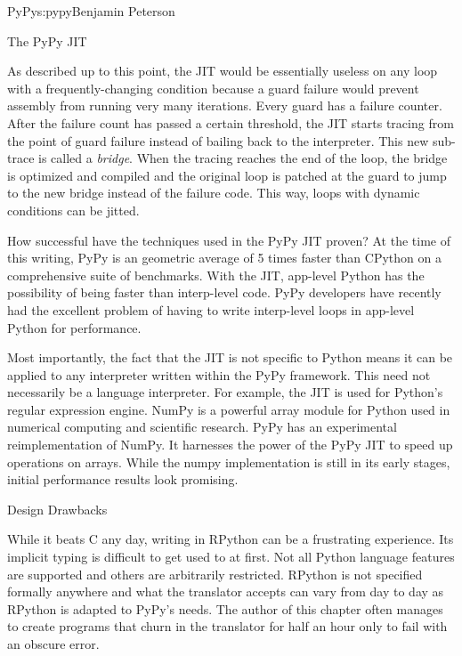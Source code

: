 \begin{aosachapter}{PyPy}{s:pypy}{Benjamin Peterson}
\begin{aosasect1}{The PyPy JIT}

As described up to this point, the JIT would be essentially useless on any loop
with a frequently-changing condition because a guard failure would prevent
assembly from running very many iterations. Every guard has a failure
counter. After the failure count has passed a certain threshold, the JIT starts
tracing from the point of guard failure instead of bailing back to the
interpreter. This new sub-trace is called a \emph{bridge}. When the tracing
reaches the end of the loop, the bridge is optimized and compiled and the
original loop is patched at the guard to jump to the new bridge instead of the
failure code. This way, loops with dynamic conditions can be jitted.

How successful have the techniques used in the PyPy JIT proven? At the time of
this writing, PyPy is an geometric average of 5 times faster than CPython on a
comprehensive suite of benchmarks. With the JIT, app-level Python has the
possibility of being faster than interp-level code. PyPy developers have
recently had the excellent problem of having to write interp-level loops in
app-level Python for performance.

Most importantly, the fact that the JIT is not specific to Python means it can
be applied to any interpreter written within the PyPy framework. This need not
necessarily be a language interpreter. For example, the JIT is used for Python's
regular expression engine. NumPy is a powerful array module for Python used in
numerical computing and scientific research. PyPy has an experimental
reimplementation of NumPy. It harnesses the power of the PyPy JIT to speed up
operations on arrays. While the numpy implementation is still in its early
stages, initial performance results look promising.

\end{aosasect1}

\begin{aosasect1}{Design Drawbacks}
\label{sec:drawbacks}

While it beats C any day, writing in RPython can be a frustrating
experience. Its implicit typing is difficult to get used to at first. Not all
Python language features are supported and others are arbitrarily
restricted. RPython is not specified formally anywhere and what the translator
accepts can vary from day to day as RPython is adapted to PyPy's needs. The
author of this chapter often manages to create programs that churn in the
translator for half an hour only to fail with an obscure error.


\end{aosasect1}
\end{aosachapter}
